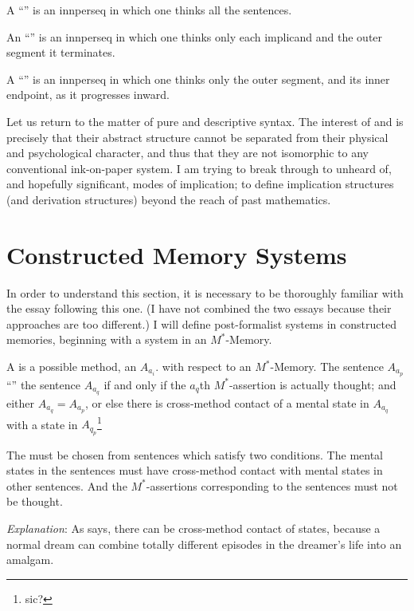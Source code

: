 
\begin{sysrules}
A \enquote{} is an innperseq in which one thinks all the 
sentences. 

An \enquote{} is an innperseq in which one thinks 
only each implicand and the outer segment it terminates. 

A \enquote{} is an innperseq in which one thinks 
only the outer segment, and its inner endpoint, as it progresses inward. 
\end{sysrules}


Let us return to the matter of pure and descriptive syntax. The interest 
of  and  is precisely that their abstract structure 
cannot be separated from their physical and psychological character, and 
thus that they are not isomorphic to any conventional ink-on-paper system. I 
am trying to break through to unheard of, and hopefully significant, modes 
of implication; to define implication structures (and derivation structures) 
beyond the reach of past mathematics. 

\clearpage
\section{Constructed Memory Systems}

In order to understand this section, it is necessary to be thoroughly 
familiar with  the essay following this 
one. (I have not combined the two essays because their approaches are too 
different.) I will define post-formalist systems in constructed memories, 
beginning with a system in an $M^*$-Memory. 


\begin{sysrules}
A  is a possible method, an $A_{a_i}$. with respect to an $M^*$-Memory. 
The sentence $A_{a_p}$ \enquote{} the sentence $A_{a_q}$ if and only if the $a_q$th 
$M^*$-assertion is actually thought; and either $A_{a_q} = A_{a_p}$, or else there is 
cross-method contact of a mental state in $A_{a_q}$ with a state in $A_{q_p}$\footnote{sic?}

The  must be chosen from sentences which satisfy two conditions. 
The mental states in the sentences must have cross-method contact 
with mental states in other sentences. And the $M^*$-assertions 
corresponding to the sentences must not be thought. 

\emph{Explanation}: As  says, there can be 
cross-method contact of states, because a normal dream can 
combine totally different episodes in the dreamer's life into an 
amalgam. 
\end{sysrules}

